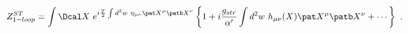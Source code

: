 \begin{equation}
  Z^{ST}_{1-loop} = \int
  \Dcal X~e^{i\frac{T}{2}\int d^2w~\eta_{\mu\nu}\pat X^\mu \patb X^\nu}
  \left\{ 1+i\frac{g_{str}}{\alpha'}\int d^2w~h_{\mu\nu}(X)\pat X^\mu \patb
  X^\nu +\cdots \right\} \ .
\end{equation}

